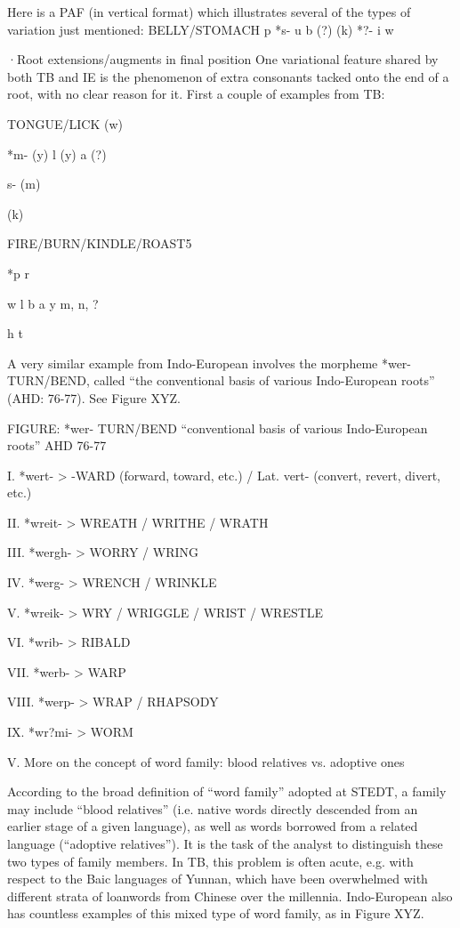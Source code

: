 Here is a PAF (in vertical format) which illustrates several of the types of variation just mentioned:
BELLY/STOMACH
			p
		*s-		u
			b		(?)	(k)
		*?-		i
			w
	
·Root extensions/augments in final position
One variational feature shared by both TB and IE is the phenomenon of extra consonants tacked onto the end of a root, with no clear reason for it.  First a couple of examples from TB:

		
TONGUE/LICK
							(w)
	
		*m-
							(y)
			l	(y)	a	(?)	

		  s-					(m)

	
							(k)










FIRE/BURN/KINDLE/ROAST5

			*p			r

				w		l
			 b		a	
				y		m, n, ?
						
			 h			t


A very similar example from Indo-European involves the morpheme *wer- TURN/BEND, called “the conventional basis of various Indo-European roots” (AHD: 76-77). See Figure XYZ.

FIGURE: *wer- TURN/BEND  “conventional basis of various Indo-European roots”  AHD 76-77

I.    *wert-	>	-WARD	(forward, toward, etc.) / Lat. vert- (convert, revert, divert, etc.)

II.   *wreit-	>	WREATH / WRITHE / WRATH

III.  *wergh-	>	WORRY / WRING

IV.  *werg-	>	WRENCH / WRINKLE

V.   *wreik-	>	WRY / WRIGGLE / WRIST / WRESTLE

VI.  *wrib-	>	RIBALD

VII. *werb-	>	WARP

VIII.  *werp-	>	WRAP / RHAPSODY

IX.   *wr?mi-	>	WORM


V. More on the concept of word family: blood relatives vs. adoptive ones

According to the broad definition of “word family” adopted at STEDT, a family may include “blood relatives” (i.e. native words directly descended from an earlier stage of a given language), as well as words borrowed from a related language (“adoptive relatives”). It is the task of the analyst to distinguish these two types of family members. In TB, this problem is often acute, e.g. with respect to the Baic languages of Yunnan, which have been overwhelmed with different strata of loanwords from Chinese over the millennia.  Indo-European also has countless examples of this mixed type of word family, as in Figure XYZ.

